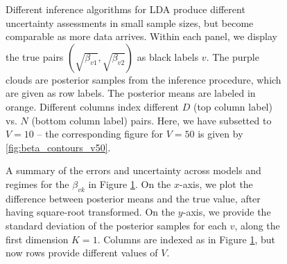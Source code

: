 \documentclass[final]{beamer}
\newlength{\sepwid}
\newlength{\onecolwid}
\begin{document}
\begin{frame}
\begin{columns}
\begin{column}{\onecolwid}
\begin{figure}[!p]
  \caption{Different inference algorithms for LDA produce different uncertainty
    assessments in small sample sizes, but become comparable as more data arrives.
    Within each panel, we display the true pairs $\left(\sqrt{\beta_{v1}},
    \sqrt{\beta_{v2}}\right)$ as black labels $v$. The purple clouds are
    posterior samples from the inference procedure, which are given as row labels. The
    posterior means are labeled in orange. Different columns index different $D$
    (top column label) vs. $N$ (bottom column label) pairs. Here, we have
    subsetted to $V = 10$ -- the corresponding figure for $V = 50$ is given by
    \ref{fig:beta_contours_v50}.
  }
  \label{fig:beta_contours_v10}
\end{figure}

\begin{figure}[!p]
  \centering
  \caption{A summary of the errors and uncertainty across models and regimes for
    the $\beta_{vk}$ in Figure \ref{fig:beta_contours_v10}. On the $x$-axis,
    we plot the difference between posterior means and the true value, after
    having square-root transformed. On the $y$-axis, we provide the standard
    deviation of the posterior samples for each $v$, along the first dimension
    $K = 1$. Columns are indexed as in Figure \ref{fig:beta_contours_v10}, but
    now rows provide different values of $V$.
    \label{fig:beta_errors_lda} }
\end{figure}
\end{column} 

\begin{column}{\sepwid}\end{column}




\end{columns}
\end{frame}
\end{document}
